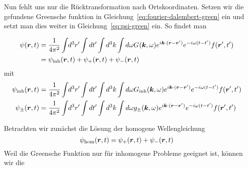 Nun fehlt uns nur die Rücktransformation nach Ortskoordinaten. Setzen wir die gefundene Greensche funktion in Gleichung~\ref{eq:fourier-dalembert-green} ein und setzt man dies weiter in Gleichung~\ref{eq:psi-green} ein. So findet man
\begin{center}
\begin{equation}
  \begin{split}
    \psi(\vb*r, t)
    &=\frac{1}{4\pi^2} \int_{}\,d^3r'\int dt'
    \int d^3k \int d\omega 
    G_{}(\vb*k,\omega)
    e^{i\vb*k\cdot(\vb*r-\vb*r')}
    e^{-i\omega(t-t')}
    f(\vb*r', t')\\
    &=\psi_\text{inh}(\vb*r, t) + \psi_+(\vb*r, t) + \psi_-(\vb*r, t)\\
  \end{split}
\end{equation}
  mit 
\begin{equation}
  \begin{split}
    \psi_\text{inh}(\vb*r, t)
    &=
    \frac{1}{4\pi^2} \int_{}\,d^3r'\int dt'
    \int d^3k \int d\omega 
    G_\text{inh}(\vb*k, \omega)
    e^{i\vb*k\cdot(\vb*r-\vb*r')}
    e^{-i\omega(t-t')}
    f(\vb*r', t')\\
    \psi_\pm(\vb*r, t)
    &=
    \frac{1}{4\pi^2} \int_{}\,d^3r'\int dt'
    \int d^3k \int d\omega 
    g_\pm(\vb*k, \omega)
    e^{i\vb*k\cdot(\vb*r-\vb*r')}
    e^{-i\omega(t-t')}
    f(\vb*r', t')\\
  \end{split}
\end{equation}
\end{center} 
Betrachten wir zunächst die Lösung der homogene Wellengleichung
\begin{equation}
  \psi_\text{hom}(\vb*r, t) = \psi_+(\vb*r, t) + \psi_-(\vb*r, t)
\end{equation}
Weil die Greensche Funktion nur für inhomogene Probleme geeignet ist, können wir die 
